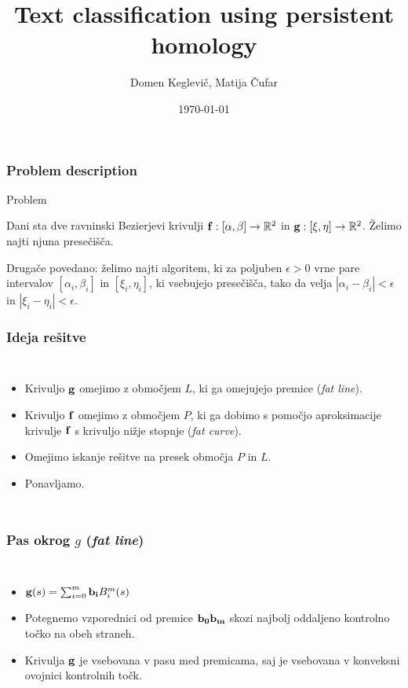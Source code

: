 \documentclass[unknownkeysallowed]{beamer}
\title[Text Analysis]{Text classification using persistent homology} %
\author{Domen Keglevič, Matija Čufar} %
\institute[] %
{
Faculty of Computer and Information Science \\ %
\medskip
}
\date{\today} %
\def\R{\mathbb R}
\begin{document}
\begin{frame}
\titlepage %
\end{frame}

\begin{frame}
\frametitle{Problem description} 
\begin{block}{Problem}

Dani sta dve ravninski Bezierjevi krivulji ${\bf f}: [\alpha,\beta]\rightarrow \R ^2$ in ${\bf g}:[\xi,\eta]\rightarrow \R^2$. Želimo najti njuna presečišča.

\medskip

Drugače povedano: želimo najti algoritem, ki za poljuben $\epsilon >0$ vrne pare intervalov $[\alpha _i,\beta _i]$ in  $[\xi _i, \eta _i]$, ki vsebujejo presečišča, tako da velja $|\alpha _i - \beta _i| < \epsilon$ in  $|\xi _i - \eta _i| < \epsilon$.
\end{block}
\end{frame}


\begin{frame}
\frametitle{Ideja rešitve}
\begin{columns}[c]
	\begin{itemize}
		\item Krivuljo ${\bf g}$ omejimo z območjem $L$, ki ga omejujejo premice ({\em fat line}).
		\medskip
		\item Krivuljo ${\bf f}$ omejimo z območjem $P$, ki ga dobimo s pomočjo aproksimacije krivulje ${\bf f}$ s krivuljo nižje stopnje ({\em fat curve}).
		\medskip
		\item Omejimo iskanje rešitve na presek območja $P$ in $L$.
		\medskip
		\item Ponavljamo.
	\end{itemize}
	
\end{columns}
\end{frame}

\begin{frame}
\frametitle{Pas okrog $g$ ({\em fat line})}
\begin{columns}[c]
	\begin{itemize}
		\item ${\bf g}(s) = \sum _{i=0}^m{\bf b_i}B_i^m(s)$
		\medskip
		\item Potegnemo vzporednici od premice ${\bf b_0b_m}$ skozi najbolj oddaljeno kontrolno točko na obeh straneh.
		\medskip
		\item Krivulja ${\bf g}$ je vsebovana v pasu med premicama, saj je vsebovana v konveksni ovojnici 
		kontrolnih točk.
	\end{itemize}
	
\end{columns}
\end{frame}
\end{document}
